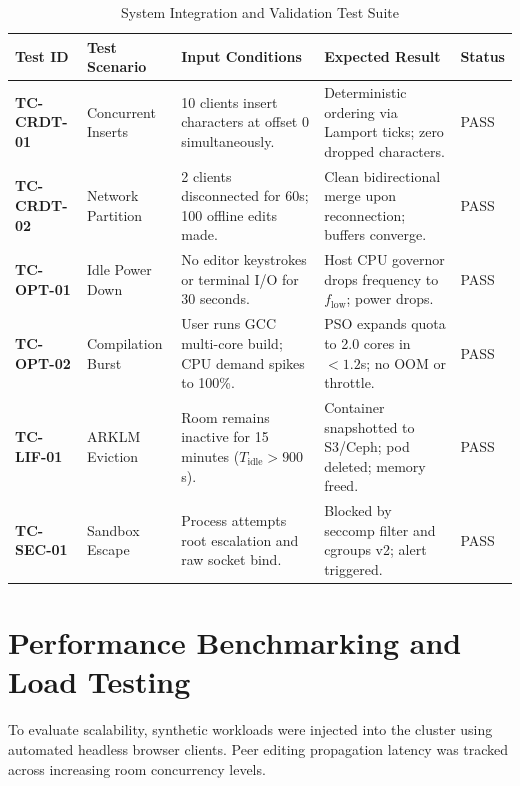 \documentclass[12pt,a4paper]{report}
\begin{document}
	\begin{table}[H]
		\centering
		\scriptsize
		\caption{System Integration and Validation Test Suite}
		\label{tab:test_cases}
		\begin{tabularx}{\linewidth}{@{}p{1.6cm}p{2.8cm}p{3.4cm}Xp{1.2cm}@{}}
			\toprule
			\textbf{Test ID} & \textbf{Test Scenario} & \textbf{Input Conditions} & \textbf{Expected Result} & \textbf{Status} \\ \midrule
			\textbf{TC-CRDT-01} & Concurrent Inserts & 10 clients insert characters at offset 0 simultaneously. & Deterministic ordering via Lamport ticks; zero dropped characters. & PASS \\
			\textbf{TC-CRDT-02} & Network Partition & 2 clients disconnected for 60s; 100 offline edits made. & Clean bidirectional merge upon reconnection; buffers converge. & PASS \\
			\textbf{TC-OPT-01} & Idle Power Down & No editor keystrokes or terminal I/O for 30 seconds. & Host CPU governor drops frequency to $f_{\text{low}}$; power drops. & PASS \\
			\textbf{TC-OPT-02} & Compilation Burst & User runs GCC multi-core build; CPU demand spikes to 100\%. & PSO expands quota to 2.0 cores in $<1.2$s; no OOM or throttle. & PASS \\
			\textbf{TC-LIF-01} & ARKLM Eviction & Room remains inactive for 15 minutes ($T_{\text{idle}} > 900$s). & Container snapshotted to S3/Ceph; pod deleted; memory freed. & PASS \\
			\textbf{TC-SEC-01} & Sandbox Escape & Process attempts root escalation and raw socket bind. & Blocked by seccomp filter and cgroups v2; alert triggered. & PASS \\ \bottomrule
		\end{tabularx}
	\end{table}
	
	\section{Performance Benchmarking and Load Testing}
	To evaluate scalability, synthetic workloads were injected into the cluster using automated headless browser clients. Peer editing propagation latency was tracked across increasing room concurrency levels.
	
\end{document}
